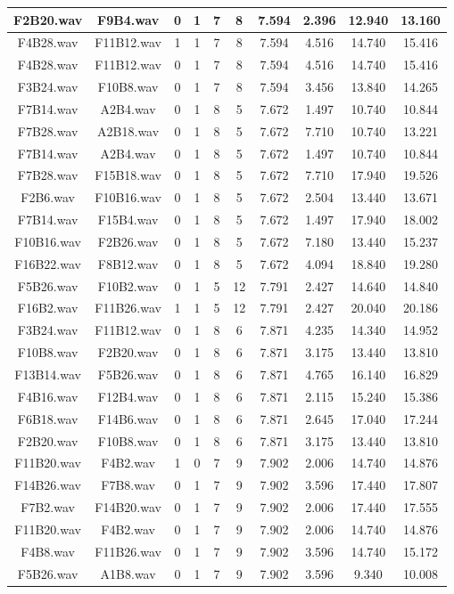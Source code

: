 \documentclass[11pt,a4paper,twoside]{book}
\begin{document}
\begin{longtable}[c]{|c|c|c|c|c|c|c|c|c|c|}
F2B20.wav&F9B4.wav&0&1&7&8&7.594&2.396&12.940&13.160\\ \hline
F4B28.wav&F11B12.wav&1&1&7&8&7.594&4.516&14.740&15.416\\ \hline
F4B28.wav&F11B12.wav&0&1&7&8&7.594&4.516&14.740&15.416\\ \hline
F3B24.wav&F10B8.wav&0&1&7&8&7.594&3.456&13.840&14.265\\ \hline
F7B14.wav&A2B4.wav&0&1&8&5&7.672&1.497&10.740&10.844\\ \hline
F7B28.wav&A2B18.wav&0&1&8&5&7.672&7.710&10.740&13.221\\ \hline
F7B14.wav&A2B4.wav&0&1&8&5&7.672&1.497&10.740&10.844\\ \hline
F7B28.wav&F15B18.wav&0&1&8&5&7.672&7.710&17.940&19.526\\ \hline
F2B6.wav&F10B16.wav&0&1&8&5&7.672&2.504&13.440&13.671\\ \hline
F7B14.wav&F15B4.wav&0&1&8&5&7.672&1.497&17.940&18.002\\ \hline
F10B16.wav&F2B26.wav&0&1&8&5&7.672&7.180&13.440&15.237\\ \hline
F16B22.wav&F8B12.wav&0&1&8&5&7.672&4.094&18.840&19.280\\ \hline
F5B26.wav&F10B2.wav&0&1&5&12&7.791&2.427&14.640&14.840\\ \hline
F16B2.wav&F11B26.wav&1&1&5&12&7.791&2.427&20.040&20.186\\ \hline
F3B24.wav&F11B12.wav&0&1&8&6&7.871&4.235&14.340&14.952\\ \hline
F10B8.wav&F2B20.wav&0&1&8&6&7.871&3.175&13.440&13.810\\ \hline
F13B14.wav&F5B26.wav&0&1&8&6&7.871&4.765&16.140&16.829\\ \hline
F4B16.wav&F12B4.wav&0&1&8&6&7.871&2.115&15.240&15.386\\ \hline
F6B18.wav&F14B6.wav&0&1&8&6&7.871&2.645&17.040&17.244\\ \hline
F2B20.wav&F10B8.wav&0&1&8&6&7.871&3.175&13.440&13.810\\ \hline
F11B20.wav&F4B2.wav&1&0&7&9&7.902&2.006&14.740&14.876\\ \hline
F14B26.wav&F7B8.wav&0&1&7&9&7.902&3.596&17.440&17.807\\ \hline
F7B2.wav&F14B20.wav&0&1&7&9&7.902&2.006&17.440&17.555\\ \hline
F11B20.wav&F4B2.wav&0&1&7&9&7.902&2.006&14.740&14.876\\ \hline
F4B8.wav&F11B26.wav&0&1&7&9&7.902&3.596&14.740&15.172\\ \hline
F5B26.wav&A1B8.wav&0&1&7&9&7.902&3.596&9.340&10.008\\ \hline

\end{longtable}
\end{document}
